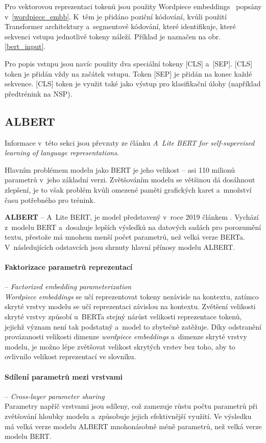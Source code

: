 Pro vektorovou reprezentaci tokenů jsou použity Wordpiece embeddings~\cite{wordpiece} popsány v~\ref{wordpiece_embb}. K~těm je přidáno poziční kódování, kvůli použití Transformer architektury a~segmentové kódování, které identifikuje, které sekvenci vstupu jednotlivé tokeny náleží. Příklad je naznačen na obr. \ref{bert_input}.\par
Pro popis vstupu jsou navíc použity dva speciální tokeny [CLS] a~[SEP]. [CLS] token je přidán vždy na začátek vstupu. Token [SEP] je přidán na konec každé sekvence. [CLS] token je využit také jako výstup pro klasifikační úlohy (například předtrénink na NSP).

\subsection{ALBERT}
Informace v~této sekci jsou převzaty ze článku \cite{ALBERT} \emph{A~Lite BERT for self-supervised learning of language representations}.\par
Hlavním problémem modelu jako BERT je jeho velikost -- asi 110 milionů parametrů v~jeho základní verzi. Zvětšováním modelu se většinou dá dosáhnout zlepšení, je to však problém kvůli omezené paměti grafických karet a~množství času potřebného pro trénink.\par
\textbf{ALBERT} -- A~Lite BERT, je model představený v~roce 2019 článkem \cite{ALBERT}. Vychází z~modelu BERT a~dosahuje lepších výsledků na datových sadách pro porozumění textu, přestože má mnohem menší počet parametrů, než velká verze BERTa. V~následujících odstavcích jsou shrnuty hlavní přínosy modelu ALBERT.

\paragraph{Faktorizace parametrů reprezentací} -- \emph{Factorized embedding parameterization}\\ 
\emph{Wordpiece embeddings} se učí reprezentovat tokeny nezávisle na kontextu, zatímco skryté vrstvy modelu se učí reprezentaci závislou na kontextu. Zvětšení velikosti skryté vrstvy způsobí u~BERTa stejný nárůst velikosti reprezentace tokenů, jejichž význam není tak podstatný a~model to zbytečně zatěžuje.
Díky odstranění provázanosti velikosti dimenze \emph{wordpiece embeddings} a~dimenze skryté vrstvy modelu, je možno lépe zvětšovat velikost skrytých vrstev bez toho, aby to ovlivnilo velikost reprezentací ve slovníku.

\paragraph{Sdílení parametrů mezi vrstvami} -- \textit{Cross-layer parameter sharing}\\
Parametry napříč vrstvami jsou sdíleny, což zamezuje růstu počtu parametrů při zvětšování hloubky modelu a~způsobuje jejich efektivnější využití. Ve výsledku má velká verze modelu ALBERT mnohonásobně méně parametrů, než velká verze modelu BERT.

